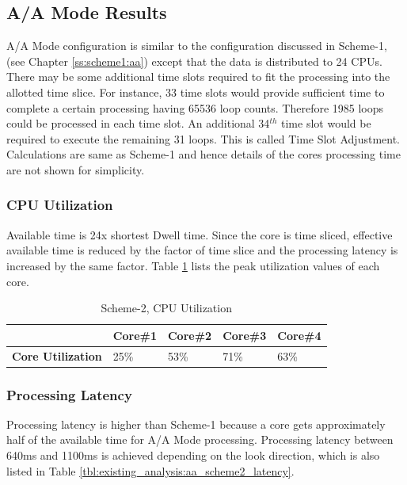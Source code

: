 \subsection{A/A Mode Results}
\label{ss:scheme2:aa}
A/A Mode configuration is similar to the configuration discussed in Scheme-1, (see Chapter \ref{ss:scheme1:aa}) except that the data is distributed to 24 CPUs. There may be some additional time slots required to fit the processing into the allotted time slice. For instance, 33 time slots would provide sufficient time to complete a certain processing having 65536 loop counts. Therefore 1985 loops could be processed in each time slot. An additional 34$^{th}$ time slot would be required to execute the remaining 31 loops. This is called Time Slot Adjustment. Calculations are same as Scheme-1 and hence details of the cores processing time are not shown for simplicity.

\subsubsection{CPU Utilization}
\label{sss:scheme2:cpu_util}
Available time is 24x shortest Dwell time. Since the core is time sliced, effective available time is reduced by the factor of time slice and the processing latency is increased by the same factor. Table \ref{tbl:existing_analysis:aa_scheme2_cpu_util} lists the peak utilization values of each core.

\begin{table}[h!]
	\centering
	\begin{tabular}{|l|l|l|l|l|} 
	 \hline
	 & \textbf{Core\#1} & \textbf{Core\#2} & \textbf{Core\#3} & \textbf{Core\#4} \\ \hline
	 \textbf{Core Utilization} & 25\% & 53\% & 71\% & 63\% \\ \hline
	\end{tabular}
	\caption{Scheme-2, CPU Utilization}
	\label{tbl:existing_analysis:aa_scheme2_cpu_util}
\end{table}

\subsubsection{Processing Latency}
\label{sss:scheme2:latency}
Processing latency is higher than Scheme-1 because a core gets approximately half of the available time for A/A Mode processing. Processing latency between 640ms and 1100ms is achieved depending on the look direction, which is also listed in Table \ref{tbl:existing_analysis:aa_scheme2_latency}.

